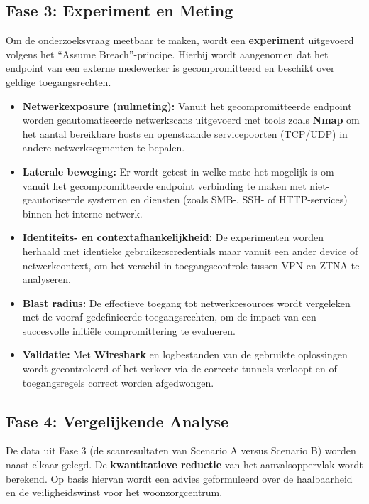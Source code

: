 \subsection{Fase 3: Experiment en Meting}
Om de onderzoeksvraag meetbaar te maken, wordt een \textbf{experiment} uitgevoerd volgens het ``Assume Breach''-principe. Hierbij wordt aangenomen dat het endpoint van een externe medewerker is gecompromitteerd en beschikt over geldige toegangsrechten.

\begin{itemize}
	\item \textbf{Netwerkexposure (nulmeting):} Vanuit het gecompromitteerde endpoint worden geautomatiseerde netwerkscans uitgevoerd met tools zoals \textbf{Nmap} om het aantal bereikbare hosts en openstaande servicepoorten (TCP/UDP) in andere netwerksegmenten te bepalen.
	
	\item \textbf{Laterale beweging:} Er wordt getest in welke mate het mogelijk is om vanuit het gecompromitteerde endpoint verbinding te maken met niet-geautoriseerde systemen en diensten (zoals SMB-, SSH- of HTTP-services) binnen het interne netwerk.
	
	\item \textbf{Identiteits- en contextafhankelijkheid:} De experimenten worden herhaald met identieke gebruikerscredentials maar vanuit een ander device of netwerkcontext, om het verschil in toegangscontrole tussen VPN en ZTNA te analyseren.
	
	\item \textbf{Blast radius:} De effectieve toegang tot netwerkresources wordt vergeleken met de vooraf gedefinieerde toegangsrechten, om de impact van een succesvolle initiële compromittering te evalueren.
	
	\item \textbf{Validatie:} Met \textbf{Wireshark} en logbestanden van de gebruikte oplossingen wordt gecontroleerd of het verkeer via de correcte tunnels verloopt en of toegangsregels correct worden afgedwongen.
\end{itemize}


\subsection{Fase 4: Vergelijkende Analyse}
De data uit Fase 3 (de scanresultaten van Scenario A versus Scenario B) worden naast elkaar gelegd. De \textbf{kwantitatieve reductie} van het aanvalsoppervlak wordt berekend. Op basis hiervan wordt een advies geformuleerd over de haalbaarheid en de veiligheidswinst voor het woonzorgcentrum.


